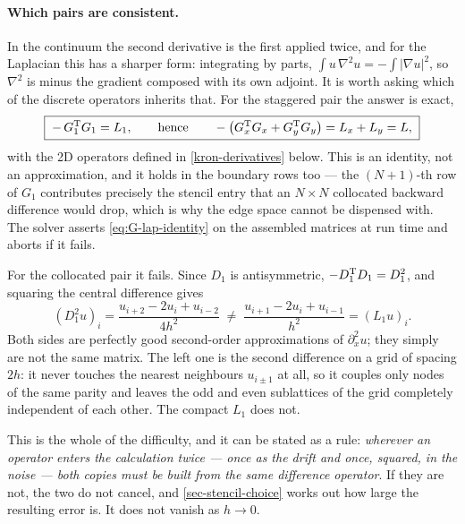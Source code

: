 \documentclass[a5paper]{article}
\begin{document}
\paragraph{Which pairs are consistent.} In the continuum the second derivative is the first applied twice, and for the Laplacian this has a sharper form: integrating by parts, $\int u\,\nabla^2u = -\int|\nabla u|^2$, so $\nabla^2$ is minus the gradient composed with its own adjoint. It is worth asking which of the discrete operators inherits that. For the staggered pair the answer is exact,
\begin{equation}
    \label{eq:G-lap-identity}
    \boxed{\;-\,G_1^{\mathrm{T}} G_1 = L_1,
    \qquad\text{hence}\qquad
    -\bigl(G_x^{\mathrm{T}} G_x + G_y^{\mathrm{T}} G_y\bigr) = L_x + L_y = L, \;}
\end{equation}
with the 2D operators defined in \eqref{kron-derivatives} below. This is an identity, not an approximation, and it holds in the boundary rows too --- the $(N{+}1)$-th row of $G_1$ contributes precisely the stencil entry that an $N\times N$ collocated backward difference would drop, which is why the edge space cannot be dispensed with. The solver asserts \eqref{eq:G-lap-identity} on the assembled matrices at run time and aborts if it fails.

For the collocated pair it fails. Since $D_1$ is antisymmetric, $-D_1^{\mathrm{T}} D_1 = D_1^2$, and squaring the central difference gives
\begin{equation}
    \label{eq:wide-laplacian}
    (D_1^2u)_i = \frac{u_{i+2}-2u_i+u_{i-2}}{4h^2}
    \;\neq\;
    \frac{u_{i+1}-2u_i+u_{i-1}}{h^2} = (L_1u)_i .
\end{equation}
Both sides are perfectly good second-order approximations of $\partial_x^2u$; they simply are not the same matrix. The left one is the second difference on a grid of spacing $2h$: it never touches the nearest neighbours $u_{i\pm1}$ at all, so it couples only nodes of the same parity and leaves the odd and even sublattices of the grid completely independent of each other. The compact $L_1$ does not.

This is the whole of the difficulty, and it can be stated as a rule: \emph{wherever an operator enters the calculation twice --- once as the drift and once, squared, in the noise --- both copies must be built from the same difference operator}. If they are not, the two do not cancel, and \cref{sec-stencil-choice} works out how large the resulting error is. It does not vanish as $h\to0$.
\end{document}
